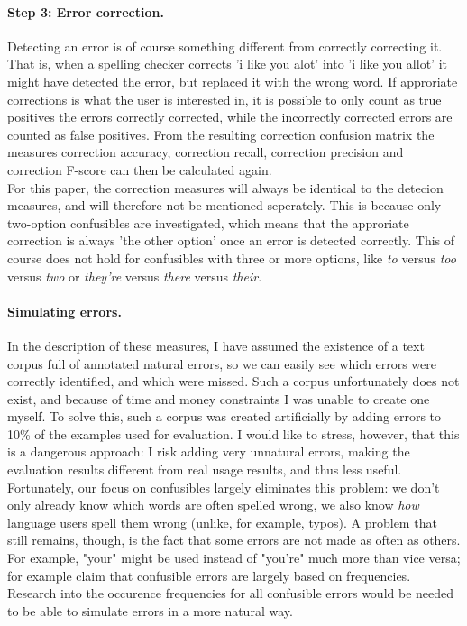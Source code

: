 \documentclass[12pt]{article}
\begin{document}
\paragraph{Step 3: Error correction.} Detecting an error is of course something different from correctly correcting it. That is, when a spelling checker corrects 'i like you alot' into 'i like you allot' it might have detected the error, but replaced it with the wrong word. If approriate corrections is what the user is interested in, it is possible to only count as true positives the errors correctly corrected, while the incorrectly corrected errors are counted as false positives. From the resulting correction confusion matrix the measures correction accuracy, correction recall, correction precision and correction F-score can then be calculated again. \\\indent
For this paper, the correction measures will always be identical to the detecion measures, and will therefore not be mentioned seperately. This is because only two-option confusibles are investigated, which means that the approriate correction is always 'the other option' once an error is detected correctly. This of course does not hold for confusibles with three or more options, like \emph{to} versus \emph{too} versus \emph{two} or \emph{they're} versus \emph{there} versus \emph{their}.

\paragraph{Simulating errors.} In the description of these measures, I have assumed the existence of a text corpus full of annotated natural errors, so we can easily see which errors were correctly identified, and which were missed. Such a corpus unfortunately does not exist, and because of time and money constraints I was unable to create one myself. To solve this, such a corpus was created artificially by adding errors to 10\% of the examples used for evaluation. I would like to stress, however, that this is a dangerous approach: I risk adding very unnatural errors, making the evaluation results different from real usage results, and thus less useful. \\\indent
Fortunately, our focus on confusibles largely eliminates this problem: we don't only already know which words are often spelled wrong, we also know \emph{how} language users spell them wrong (unlike, for example, typos). A problem that still remains, though, is the fact that some errors are not made as often as others. For example, "your" might be used instead of "you're" much more than vice versa; \citet{sfd99} for example claim that confusible errors are largely based on frequencies. Research into the occurence frequencies for all confusible errors would be needed to be able to simulate errors in a more natural way.
\end{document}
